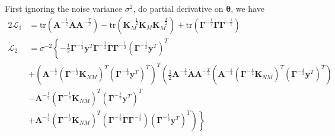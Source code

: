 \documentclass[10pt,a4paper]{article}
\begin{document}
First ignoring the noise variance $\sigma^2$, do partial derivative on $\pmb{\theta}$, we have
\begin{equation}
\begin{split}
2\dot{\mathcal{L}}_1&=\mathrm{tr}(\pmb{A}^{-\frac{1}{2}}\dot{\pmb{A}}\pmb{A}^{-\frac{T}{2}})-\mathrm{tr}(\pmb{K}_M^{-\frac{1}{2}}\dot{\pmb{K}}_M\pmb{K}_M^{-\frac{T}{2}})+\mathrm{tr}(\pmb{\Gamma}^{-\frac{1}{2}}\dot{\pmb{\Gamma}}\pmb{\Gamma}^{-\frac{1}{2}})\\
\dot{\mathcal{L}}_2&=\sigma^{-2}\left\lbrace-\frac{1}{2}\pmb{\Gamma}^{-\frac{1}{2}}\pmb{y}^T\pmb{\Gamma}^{-\frac{1}{2}}\dot{\pmb{\Gamma}}\pmb{\Gamma}^{-\frac{1}{2}}(\pmb{\Gamma}^{-\frac{1}{2}}\pmb{y}^T)^T\right.\\
&+(\pmb{A}^{-\frac{1}{2}}(\pmb{\Gamma}^{-\frac{1}{2}}\pmb{K}_{NM})^T(\pmb{\Gamma}^{-\frac{1}{2}}\pmb{y}^T)^T)^T\left(\frac{1}{2}\pmb{A}^{-\frac{1}{2}}\dot{\pmb{A}}\pmb{A}^{-\frac{T}{2}}(\pmb{A}^{-\frac{1}{2}}(\pmb{\Gamma}^{-\frac{1}{2}}\pmb{K}_{NM})^T(\pmb{\Gamma}^{-\frac{1}{2}}\pmb{y}^T)^T)\right.\\
&-\pmb{A}^{-\frac{1}{2}}(\pmb{\Gamma}^{-\frac{1}{2}}\dot{\pmb{K}}_{NM})^T(\pmb{\Gamma}^{-\frac{1}{2}}\pmb{y}^T)^T\\
&\left.\left.+\pmb{A}^{-\frac{1}{2}}(\pmb{\Gamma}^{-\frac{1}{2}}\pmb{K}_{NM})^T(\pmb{\Gamma}^{-\frac{1}{2}}\dot{\pmb{\Gamma}}\pmb{\Gamma}^{-\frac{1}{2}})(\pmb{\Gamma}^{-\frac{1}{2}}\pmb{y}^T)^T\right)\right\rbrace
\end{split}
\end{equation}
\end{document}
